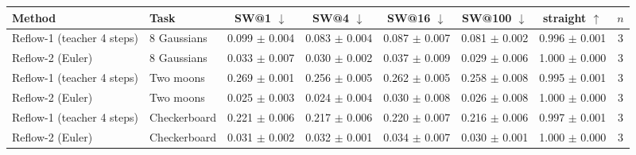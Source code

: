 \begin{tabular}{llcccccc}
\toprule
Method & Task & SW@1 $\downarrow$ & SW@4 $\downarrow$ & SW@16 $\downarrow$ & SW@100 $\downarrow$ & straight $\uparrow$ & $n$ \\
\midrule
Reflow-1 (teacher 4 steps) & 8 Gaussians & 0.099 $\pm$ 0.004 & 0.083 $\pm$ 0.004 & 0.087 $\pm$ 0.007 & 0.081 $\pm$ 0.002 & 0.996 $\pm$ 0.001 & 3 \\
Reflow-2 (Euler) & 8 Gaussians & 0.033 $\pm$ 0.007 & 0.030 $\pm$ 0.002 & 0.037 $\pm$ 0.009 & 0.029 $\pm$ 0.006 & 1.000 $\pm$ 0.000 & 3 \\
\midrule
Reflow-1 (teacher 4 steps) & Two moons & 0.269 $\pm$ 0.001 & 0.256 $\pm$ 0.005 & 0.262 $\pm$ 0.005 & 0.258 $\pm$ 0.008 & 0.995 $\pm$ 0.001 & 3 \\
Reflow-2 (Euler) & Two moons & 0.025 $\pm$ 0.003 & 0.024 $\pm$ 0.004 & 0.030 $\pm$ 0.008 & 0.026 $\pm$ 0.008 & 1.000 $\pm$ 0.000 & 3 \\
\midrule
Reflow-1 (teacher 4 steps) & Checkerboard & 0.221 $\pm$ 0.006 & 0.217 $\pm$ 0.006 & 0.220 $\pm$ 0.007 & 0.216 $\pm$ 0.006 & 0.997 $\pm$ 0.001 & 3 \\
Reflow-2 (Euler) & Checkerboard & 0.031 $\pm$ 0.002 & 0.032 $\pm$ 0.001 & 0.034 $\pm$ 0.007 & 0.030 $\pm$ 0.001 & 1.000 $\pm$ 0.000 & 3 \\
\bottomrule
\end{tabular}
